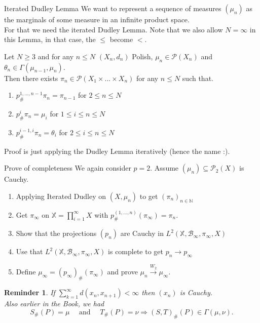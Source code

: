 \documentclass[10pt]{beamer}
\theoremstyle{reminder}
\newtheorem{reminder}{Reminder}
\begin{document}
\begin{frame}{Iterated Dudley Lemma}
    We want to represent a sequence of measures $(\mu_n)$ as the marginals of some measure in an infinite product space. \\ 
    \vspace{0.5cm}
    For that we need the iterated Dudley Lemma. Note that we also allow $N = \infty$ in this Lemma, in that case, the $\leq$ become $<$.
    \begin{lemma}
        Let $N \geq 3$ and for any $n \leq N$ $(X_n,d_n)$ Polish, $\mu_n \in \mathcal{P}(X_n)$ and $\theta_n \in \Gamma(\mu_{n-1},\mu_n)$. \\ 
        Then there exists $\pi_n \in \mathcal{P}(X_1\times ... \times X_n)$ for any $n \leq N$ such that.
        \begin{enumerate}
            \item $p^{1,...,n-1}_{\#} \pi_n = \pi_{n-1}$ for $2 \leq n \leq N$
            \item $p^i_{\#} \pi_n = \mu_i$ for $1 \leq i \leq n \leq N$
            \item $p^{i-1,i}_{\#} \pi_n = \theta_i$ for $2 \leq i\leq n \leq N$
        \end{enumerate}
    \end{lemma}
    Proof is just applying the Dudley Lemma iteratively (hence the name :).
\end{frame}

\begin{frame}{Prove of completeness}
    We again consider $p = 2$. Assume $(\mu_n) \subseteq \mathcal{P}_2(X)$ is Cauchy. 
    \begin{enumerate}
        \item Applying Iterated Dudley on $(X,\mu_n)$ to get $(\pi_n)_{n \in \mathbb{N}}$ 
        \item Get $\pi_\infty$ on $\mathbb{X} = \prod_{i = 1}^{\infty} X$ with $p^{(1,...,n)}_{\#}(\pi_\infty) = \pi_n.$
        \item Show that the projections $(p_n)$ are Cauchy in $L^2(\mathbb{X}, \mathcal{B}_\infty, \pi_\infty,X)$
        \item Use that $L^2(\mathbb{X}, \mathcal{B}_\infty, \pi_\infty,X)$ is complete to get $p_n \rightarrow p_\infty$
        \item Define $\mu_\infty = (p_\infty)_{\#}(\pi_\infty)$ and prove $\mu_n \xrightarrow{W_2} \mu_\infty.$
    \end{enumerate}
    \begin{reminder}
        If $\sum_{k = 1}^{\infty} d(x_n,x_{n+1}) < \infty$ then $(x_n)$ is Cauchy. \\
        \vspace{0.5cm}
        Also earlier in the Book, we had $$S_{\#}(P) = \mu \quad \text{ and } \quad T_{\#}(P) = \nu \Rightarrow (S,T)_{\#}(P) \in \Gamma(\mu,\nu).$$
    \end{reminder}
\end{frame}
\end{document}
